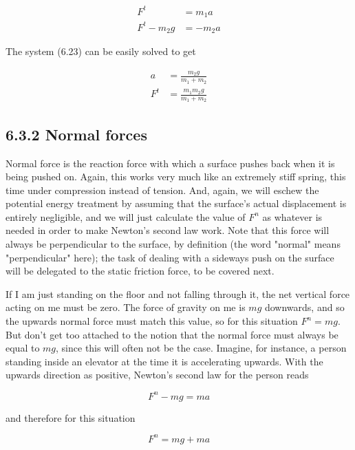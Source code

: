 \documentclass[10pt]{article}
\begin{document}
\begin{align*}
F^{t} & =m_{1} a \\
F^{t}-m_{2} g & =-m_{2} a \tag{6.23}
\end{align*}


The system (6.23) can be easily solved to get


\begin{align*}
a & =\frac{m_{2} g}{m_{1}+m_{2}} \\
F^{t} & =\frac{m_{1} m_{2} g}{m_{1}+m_{2}} \tag{6.24}
\end{align*}


\subsection*{6.3.2 Normal forces}
Normal force is the reaction force with which a surface pushes back when it is being pushed on. Again, this works very much like an extremely stiff spring, this time under compression instead of tension. And, again, we will eschew the potential energy treatment by assuming that the surface's actual displacement is entirely negligible, and we will just calculate the value of $F^{n}$ as whatever is needed in order to make Newton's second law work. Note that this force will always be perpendicular to the surface, by definition (the word "normal" means "perpendicular" here); the task of dealing with a sideways push on the surface will be delegated to the static friction force, to be covered next.

If I am just standing on the floor and not falling through it, the net vertical force acting on me must be zero. The force of gravity on me is $m g$ downwards, and so the upwards normal force must match this value, so for this situation $F^{n}=m g$. But don't get too attached to the notion that the normal force must always be equal to $m g$, since this will often not be the case. Imagine, for instance, a person standing inside an elevator at the time it is accelerating upwards. With the upwards direction as positive, Newton's second law for the person reads


\begin{equation*}
F^{n}-m g=m a \tag{6.25}
\end{equation*}


and therefore for this situation


\begin{equation*}
F^{n}=m g+m a \tag{6.26}
\end{equation*}
\end{document}
